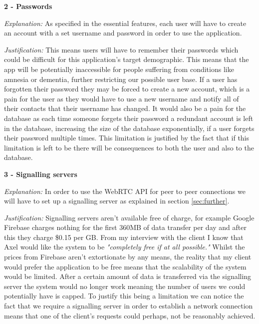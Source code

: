 \textsf{\bfseries 2 - Passwords} \\ \vspace{0.1cm}

\textit{Explanation:}
As specified in the essential features, each user will have to 
create an account with a set username and password in order to 
use the application. \vspace{0.1cm}

\textit{Justification:} This means users will have to remember 
their passwords which could be difficult for this application's
target demographic. This means that the app will be
potentially inaccessible for people suffering from conditions
like amnesia or dementia, further restricting our possible 
user base. If a user has forgotten their password they
may be forced to create a new account, which is a pain for the 
user as they would have to use a new username and notify all of
their contacts that their username has changed. It would also 
be a pain for the database as each time someone forgets their 
password a redundant account is left in the database, 
increasing the size of the database exponentially, if a user 
forgets their password multiple times. This limitation is 
justified by the fact that if this limitation is left to be
there will be consequences to both the user and also to the 
database. \\ \vspace{0.2cm}

\textsf{\bfseries 3 - Signalling servers} \\ \vspace{0.1cm}

\textit{Explanation:}
In order to use the WebRTC API for peer to peer connections we
will have to set up a signalling server as explained in 
section \ref{sec:further}. \vspace{0.1cm}

\textit{Justification:}
Signalling servers aren't
available free of charge, for example Google Firebase charges
nothing for the 
first 360MB of data transfer per day and after this they charge
\$0.15 per GB. From my interview with the client I know that 
Axel would like the system to be \textit{"completely free if
at all possible."} Whilst the prices from Firebase aren't 
extortionate by any means, the reality that my client would
prefer the application to be free means that the scalability of
the system would be limited. After a certain amount of data is 
transferred via the signalling server the system would no longer
work meaning the number of users we could potentially have is 
capped. To justify this being a limitation we can notice 
the fact that we require a signalling server in order to
establish a network connection means that one of the client's
requests could perhaps, not be reasonably achieved. \\
\vspace{0.2cm}

